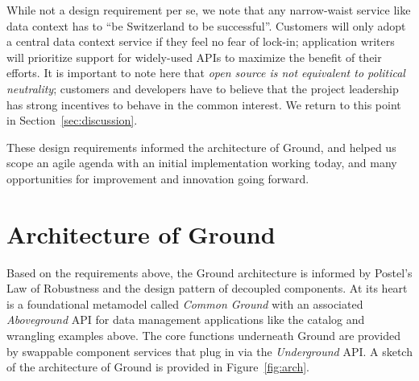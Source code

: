 \documentclass{sig-alternate}
\begin{document}
  While not a design requirement per se, we note that any narrow-waist service like data context has to ``be Switzerland to be successful''.  
Customers will only adopt a central data context service if they feel no fear of lock-in; application writers will prioritize support for widely-used APIs to maximize the benefit of their efforts. 
It is important to note here that \emph{open source is not equivalent to political neutrality}; customers and developers have to believe that the project leadership has strong incentives to behave in the common interest. 
We return to this point in Section~\ref{sec:discussion}.

\smallitembot
These design requirements informed the architecture of Ground, and helped us scope an agile agenda with an initial implementation working today, and many opportunities for improvement and innovation going forward.

\section{Architecture of Ground}
\label{sec:arch}
Based on the requirements above, the Ground architecture is informed by Postel's Law of Robustness and the design pattern of decoupled components. At its heart is a foundational metamodel called \emph{Common Ground} with an associated \emph{Aboveground} API for data management applications like the catalog and wrangling examples above. The core functions underneath Ground are provided by swappable component services that plug in via the \emph{Underground} API. 
A sketch of the architecture of Ground is provided in Figure~\ref{fig:arch}.
\end{document}
